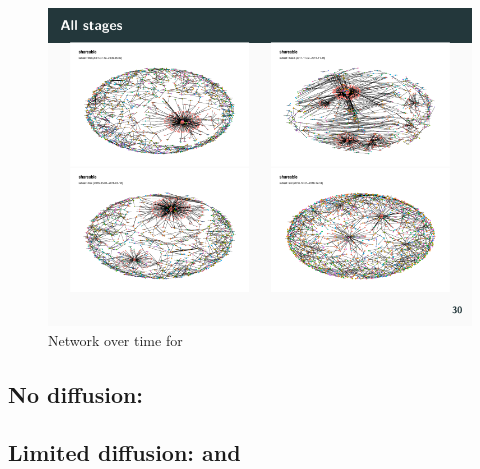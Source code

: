\documentclass[
  a4paper,
  ]{scrartcl}
\begin{document}
    \begin{figure}[H]
      \centering
      \includegraphics[width=\linewidth, height=.8\textheight, keepaspectratio]{images/net_diac_shareable.pdf}
      \caption{Network over time for }
    \end{figure}

  \subsection{No diffusion: }

  \subsection{Limited diffusion:  and }

    \subsubsection{}

    \subsubsection{}
\end{document}
